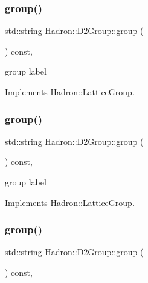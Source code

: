 \subsubsection{\texorpdfstring{group()}{group()}\hspace{0.1cm}{\footnotesize\ttfamily [1/3]}}
{\footnotesize\ttfamily std\+::string Hadron\+::\+D2\+Group\+::group (\begin{DoxyParamCaption}{ }\end{DoxyParamCaption}) const\hspace{0.3cm}{\ttfamily [inline]}, {\ttfamily [virtual]}}

group label 

Implements \mbox{\hyperlink{structHadron_1_1LatticeGroup_a82208a322bf1b1db489f16af38e70087}{Hadron\+::\+Lattice\+Group}}.

\mbox{\label{structHadron_1_1D2Group_aa6d99edf22f99550602f38437aadd890}} 
\subsubsection{\texorpdfstring{group()}{group()}\hspace{0.1cm}{\footnotesize\ttfamily [2/3]}}
{\footnotesize\ttfamily std\+::string Hadron\+::\+D2\+Group\+::group (\begin{DoxyParamCaption}{ }\end{DoxyParamCaption}) const\hspace{0.3cm}{\ttfamily [inline]}, {\ttfamily [virtual]}}

group label 

Implements \mbox{\hyperlink{structHadron_1_1LatticeGroup_a82208a322bf1b1db489f16af38e70087}{Hadron\+::\+Lattice\+Group}}.

\mbox{\label{structHadron_1_1D2Group_aa6d99edf22f99550602f38437aadd890}} 
\subsubsection{\texorpdfstring{group()}{group()}\hspace{0.1cm}{\footnotesize\ttfamily [3/3]}}
{\footnotesize\ttfamily std\+::string Hadron\+::\+D2\+Group\+::group (\begin{DoxyParamCaption}{ }\end{DoxyParamCaption}) const\hspace{0.3cm}{\ttfamily [inline]}, {\ttfamily [virtual]}}

